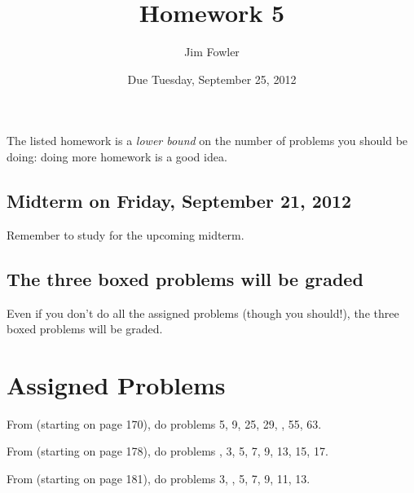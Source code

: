\documentclass[12pt]{handout}
\title{Homework 5}
\date{Due Tuesday, September 25, 2012}
\author{Jim Fowler}
\begin{document}
\maketitle




The listed homework is a \textit{lower bound} on the number of
problems you should be doing: doing more homework is a good idea.


\subsection*{Midterm on Friday, September 21, 2012}
Remember to study for the upcoming midterm.




\subsection*{The three boxed problems will be graded}
Even if you don't do all the assigned problems (though you should!), the three boxed problems will be graded.

\section*{Assigned Problems}

From  (starting on page 170),
do problems 5, 9, 25, 29, , 55, 63.
\vspace{1ex}

From  (starting on page 178),
do problems , 3, 5, 7, 9, 13, 15, 17.
\vspace{1ex}

From  (starting on page 181),
do problems 3, , 5, 7, 9, 11, 13.
\vspace{1ex}
\end{document}
